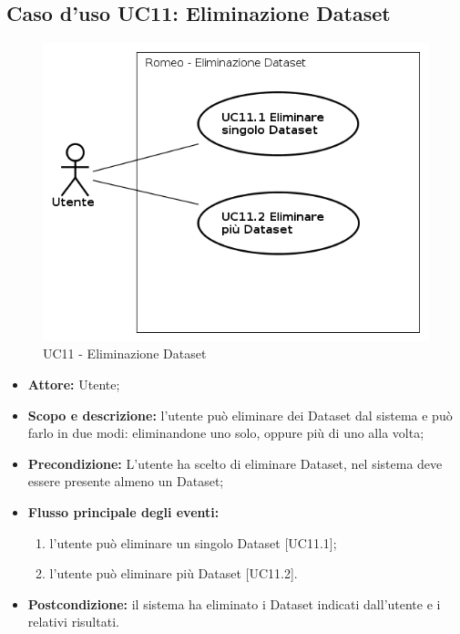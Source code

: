 \subsection{Caso d'uso UC11: Eliminazione Dataset}
\begin{figure}[!h]
\begin{center}
\includegraphics[scale=0.6]{./img/Use_Case/UC11}
\caption{UC11 - Eliminazione Dataset}
\end{center}
\end{figure}
\begin{itemize}
\item \textbf{Attore:} Utente;
\item \textbf{Scopo e descrizione:} l'utente può eliminare dei Dataset\glossario{} dal sistema e può farlo in due modi: eliminandone uno solo, oppure più di uno alla volta;
\item \textbf{Precondizione:} L'utente ha scelto di eliminare Dataset\glossario{}, nel sistema deve essere presente almeno un Dataset\glossario{};
\item \textbf{Flusso principale degli eventi:}
\begin{enumerate}
\item l'utente può eliminare un singolo Dataset\glossario{} [UC11.1];
\item l'utente può eliminare più Dataset\glossario{} [UC11.2].
\end{enumerate}
\item \textbf{Postcondizione:} il sistema ha eliminato i Dataset\glossario{} indicati dall'utente e i relativi risultati.
\end{itemize}

